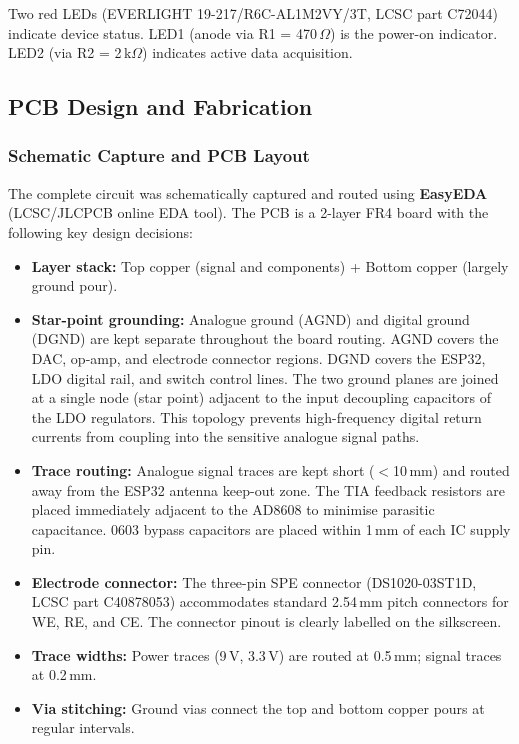 Two red LEDs (EVERLIGHT 19-217/R6C-AL1M2VY/3T, LCSC part C72044) indicate device status. LED1 (anode via R1 = 470\,$\Omega$) is the power-on indicator. LED2 (via R2 = 2\,k$\Omega$) indicates active data acquisition.

\subsection{PCB Design and Fabrication}
\label{subsec:pcb}

\subsubsection{Schematic Capture and PCB Layout}

The complete circuit was schematically captured and routed using \textbf{EasyEDA} (LCSC/JLCPCB online EDA tool). The PCB is a 2-layer FR4 board with the following key design decisions:

\begin{itemize}
    \item \textbf{Layer stack:} Top copper (signal and components) + Bottom copper (largely ground pour).
    \item \textbf{Star-point grounding:} Analogue ground (AGND) and digital ground (DGND) are kept separate throughout the board routing. AGND covers the DAC, op-amp, and electrode connector regions. DGND covers the ESP32, LDO digital rail, and switch control lines. The two ground planes are joined at a single node (star point) adjacent to the input decoupling capacitors of the LDO regulators. This topology prevents high-frequency digital return currents from coupling into the sensitive analogue signal paths.
    \item \textbf{Trace routing:} Analogue signal traces are kept short ($<$10\,mm) and routed away from the ESP32 antenna keep-out zone. The TIA feedback resistors are placed immediately adjacent to the AD8608 to minimise parasitic capacitance. 0603 bypass capacitors are placed within 1\,mm of each IC supply pin.
    \item \textbf{Electrode connector:} The three-pin SPE connector (DS1020-03ST1D, LCSC part C40878053) accommodates standard 2.54\,mm pitch connectors for WE, RE, and CE. The connector pinout is clearly labelled on the silkscreen.
    \item \textbf{Trace widths:} Power traces (9\,V, 3.3\,V) are routed at 0.5\,mm; signal traces at 0.2\,mm.
    \item \textbf{Via stitching:} Ground vias connect the top and bottom copper pours at regular intervals.
\end{itemize}

